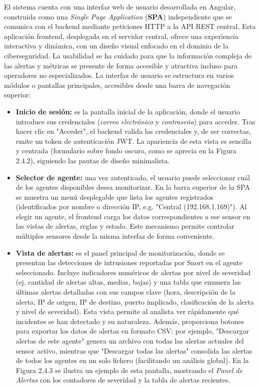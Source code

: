 \documentclass[11pt,a4paper,twoside]{report}
\begin{document}
El sistema cuenta con una interfaz web de usuario desarrollada en Angular, construida como una \emph{Single Page Application} (\textbf{SPA}) independiente que se comunica con el backend mediante peticiones HTTP a la API REST central. Esta aplicación frontend, desplegada en el servidor central, ofrece una experiencia interactiva y dinámica, con un diseño visual enfocado en el dominio de la ciberseguridad. La usabilidad se ha cuidado para que la información compleja de las alertas y métricas se presente de forma accesible y atractiva incluso para operadores no especializados.\newline
La interfaz de usuario se estructura en varios módulos o pantallas principales, accesibles desde una barra de navegación superior:\newline
\begin{itemize}
	\item \textbf{Inicio de sesión:} es la pantalla inicial de la aplicación, donde el usuario introduce sus credenciales (\emph{correo electrónico} y \emph{contraseña}) para acceder. Tras hacer clic en "Acceder", el backend valida las credenciales y, de ser correctas, emite un token de autenticación JWT. La apariencia de esta vista es sencilla y centrada (formulario sobre fondo oscuro, como se aprecia en la Figura 2.4.2), siguiendo las pautas de diseño minimalista.
	
	\item \textbf{Selector de agente:} una vez autenticado, el usuario puede seleccionar cuál de los agentes disponibles desea monitorizar. En la barra superior de la SPA se muestra un menú desplegable que lista los agentes registrados (identificados por nombre o dirección IP, e.g. "Central (192.168.1.169)"). Al elegir un agente, el frontend carga los datos correspondientes a ese sensor en las vistas de alertas, reglas y estado. Este mecanismo permite controlar múltiples sensores desde la misma interfaz de forma conveniente.
	
	\item \textbf{Vista de alertas:} es el panel principal de monitorización, donde se presentan las detecciones de intrusiones reportadas por Snort en el agente seleccionado. Incluye indicadores numéricos de alertas por nivel de severidad (ej. cantidad de alertas altas, medias, bajas) y una tabla que enumera las últimas alertas detalladas con sus campos clave (hora, descripción de la alerta, IP de origen, IP de destino, puerto implicado, clasificación de la alerta y nivel de severidad). Esta vista permite al analista ver rápidamente qué incidentes se han detectado y su naturaleza. Además, proporciona botones para exportar los datos de alertas en formato CSV: por ejemplo, "Descargar alertas de este agente" genera un archivo con todas las alertas actuales del sensor activo, mientras que "Descargar todas las alertas" consolida las alertas de todos los agentes en un solo fichero (facilitando un análisis global). En la Figura 2.4.3 se ilustra un ejemplo de esta pantalla, mostrando el \emph{Panel de Alertas} con los contadores de severidad y la tabla de alertas recientes.
	

\end{itemize}
\end{document}
